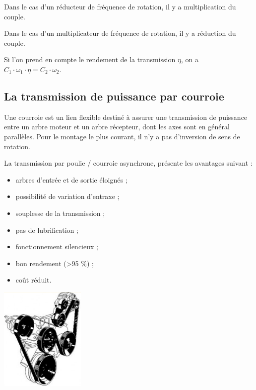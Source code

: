 \documentclass[11pt,oneside]{article}
\begin{document}
Dans le cas d’un réducteur de fréquence de rotation, il y a multiplication du couple.

Dans le cas d’un multiplicateur de fréquence de rotation, il y a réduction du couple.

Si l’on prend en compte le rendement de la transmission $\eta$, on a  $C_1 \cdot \omega_1 \cdot \eta = C_2 \cdot \omega_2$.

\subsection{La transmission de puissance par courroie}


Une courroie est un lien flexible destiné à assurer une transmission de puissance entre un arbre moteur et un arbre récepteur,  dont les axes sont en général parallèles. Pour le montage le plus courant, il n’y a pas d’inversion de sens de rotation.

\begin{minipage}[c]{.55\linewidth}
La transmission par poulie / courroie asynchrone, présente les avantages suivant :
\begin{itemize}
\item arbres d’entrée et de sortie éloignés ;
\item possibilité de variation d’entraxe ;
\item souplesse de la transmission ;
\item pas de lubrification ;
\item fonctionnement silencieux ;
\item bon rendement (>95 \%) ;
\item coût réduit.
\end{itemize}
\end{minipage} \hfill
\begin{minipage}[c]{.4\linewidth}
\begin{center}
\includegraphics[height=5cm]{png/fig_41}
\end{center}
\end{minipage} 
\end{document}
